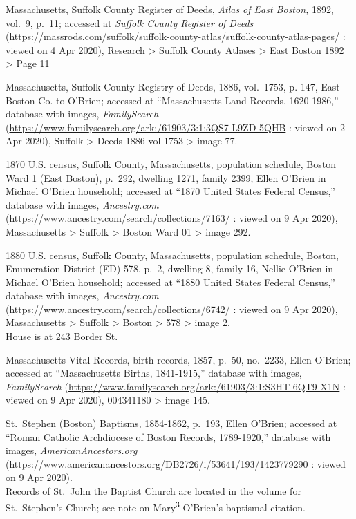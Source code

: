 \begin{thebibliography}{999}
Massachusetts, Suffolk County Register of Deeds, \textit{Atlas of East Boston,} 1892, vol.\ 9, p.\ 11; accessed at \textit{Suffolk County Register of Deeds} (\url{https://massrods.com/suffolk/suffolk-county-atlas/suffolk-county-atlas-pages/} : viewed on 4 Apr 2020), Research > Suffolk County Atlases > East Boston 1892 > Page 11

Massachusetts, Suffolk County Registry of Deeds, 1886, vol.\ 1753, p. 147, East Boston Co. to O’Brien; accessed at ``Massachusetts Land Records, 1620-1986,'' database with images, \textit{FamilySearch} (\url{https://www.familysearch.org/ark:/61903/3:1:3QS7-L9ZD-5QHB} : viewed on 2 Apr 2020), Suffolk > Deeds 1886 vol 1753 > image 77.

1870 U.S. census, Suffolk County, Massachusetts, population schedule, Boston Ward 1 (East Boston), p.\ 292, dwelling 1271, family 2399, Ellen O'Brien in Michael O'Brien household; accessed at ``1870 United States Federal Census,'' database with images, \textit{Ancestry.com} (\url{https://www.ancestry.com/search/collections/7163/} : viewed on 9 Apr 2020), Massachusetts > Suffolk > Boston Ward 01 > image 292.

1880 U.S. census, Suffolk County, Massachusetts, population schedule, Boston, Enumeration District (ED) 578, p.\ 2, dwelling 8, family 16, Nellie O'Brien in Michael O'Brien household; accessed at ``1880 United States Federal Census,'' database with images, \textit{Ancestry.com} (\url{https://www.ancestry.com/search/collections/6742/} : viewed on 9 Apr 2020), Massachusetts > Suffolk > Boston > 578 > image 2.\\
House is at 243 Border St.

Massachusetts Vital Records, birth records, 1857, p.\ 50, no.\ 2233, Ellen O'Brien; accessed at ``Massachusetts Births, 1841-1915,'' database with images, \textit{FamilySearch} (\url{https://www.familysearch.org/ark:/61903/3:1:S3HT-6QT9-X1N} : viewed on 9 Apr 2020), 004341180 > image 145.

St.\ Stephen (Boston) Baptisms, 1854-1862, p.\ 193, Ellen O'Brien; accessed at ``Roman Catholic Archdiocese of Boston Records, 1789-1920,'' database with images, \textit{AmericanAncestors.org} (\url{https://www.americanancestors.org/DB2726/i/53641/193/1423779290} : viewed on 9 Apr 2020).\\
Records of St.\ John the Baptist Church are located in the volume for St.\ Stephen's Church; see note on Mary\textsuperscript{3} O'Brien's baptismal citation.


\end{thebibliography}
